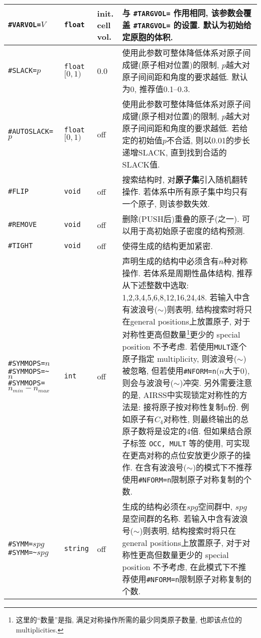 \documentclass[a4paper, 10pt]{article}
\begin{document}
\begin{center}
\begin{longtable}{m{11em}|m{4em}<{\centering}|m{3em}<{\centering}|m{15em}}
\midrule
\verb|#VARVOL=|\(V\)& \verb|float| & init. cell vol. & 与 \verb|#TARGVOL=| 作用相同, 该参数会覆盖 \verb|#TARGVOL=| 的设置. 默认为初始给定原胞的体积.\\
\midrule
\verb|#SLACK=|\(p\)& \verb|float| \([0,1)\) & 0.0 & 使用此参数可整体降低体系对原子间成键(原子相对位置)的限制, \(p\)越大对原子间间距和角度的要求越低. 默认为0, 推荐值0.1--0.3.\\
\midrule
\verb|#AUTOSLACK=|\(p\)& \verb|float| \([0,1)\) & off & 使用此参数可整体降低体系对原子间成键(原子相对位置)的限制, \(p\)越大对原子间间距和角度的要求越低. 若给定的初始值\(p\)不合适, 则以0.01的步长递增SLACK, 直到找到合适的SLACK值.\\
\midrule
\verb|#FLIP|& \verb|void| & off & 搜索结构时, 对\textbf{原子集}引入随机翻转操作. 若体系中所有原子集中均只有一个原子, 则该参数失效.\\
\midrule
\verb|#REMOVE|& \verb|void| & off & 删除(PUSH后)重叠的原子(之一). 可以用于高初始原子密度的结构预测.\\
\midrule
\verb|#TIGHT|& \verb|void| & off & 使得生成的结构更加紧密.\\
\midrule
\verb|#SYMMOPS=|\(n\)\hspace{6em}\verb|#SYMMOPS=~|\(n\;\;\;\;\;\;\;\;\;\;\;\)\hspace{6em}\verb|#SYMMOPS=|\(n_{min}-n_{max}\) & \verb|int| &  off & 声明生成的结构中必须含有\(n\)种对称操作. 若体系是周期性晶体结构, 推荐从下述整数中选取: 1,2,3,4,5,6,8,12,16,24,48. 若输入中含有波浪号(\(\sim\))则表明, 结构搜索时将只在general positions上放置原子, 对于对称性更高但数量\footnote{这里的``数量''是指, 满足对称操作所需的最少同类原子数量, 也即该点位的 multiplicities. }更少的 special position 不予考虑. 若使用\verb|MULT|逐个原子指定 multiplicity, 则波浪号(\(\sim\))被忽略, 但若使用\verb|#NFORM=n|(\(n\)大于0), 则会与波浪号(\(\sim\))冲突. 另外需要注意的是, AIRSS中实现锁定对称性的方法是: 接将原子按对称性复制n份. 例如原子有\(C_4\)对称性, 则最终输出的总原子数将是设定的4倍. 但如果结合原子标签 \verb|OCC, MULT| 等的使用, 可实现在更高对称的点位安放更少原子的操作. 在含有波浪号(\(\sim\))的模式下不推荐使用\verb|#NFORM=n|限制原子对称复制的个数.\\
\midrule
\verb|#SYMM=|\(spg\)\hspace{6em} \verb|#SYMM=~|\(spg\)& \verb|string| & off & 生成的结构必须在\(spg\)空间群中, \(spg\)是空间群的名称. 若输入中含有波浪号(\(\sim\))则表明, 结构搜索时将只在general positions上放置原子, 对于对称性更高但数量更少的 special position 不予考虑, 在此模式下不推荐使用\verb|#NFORM=n|限制原子对称复制的个数.\\

\end{longtable}
\end{center}
\end{document}
